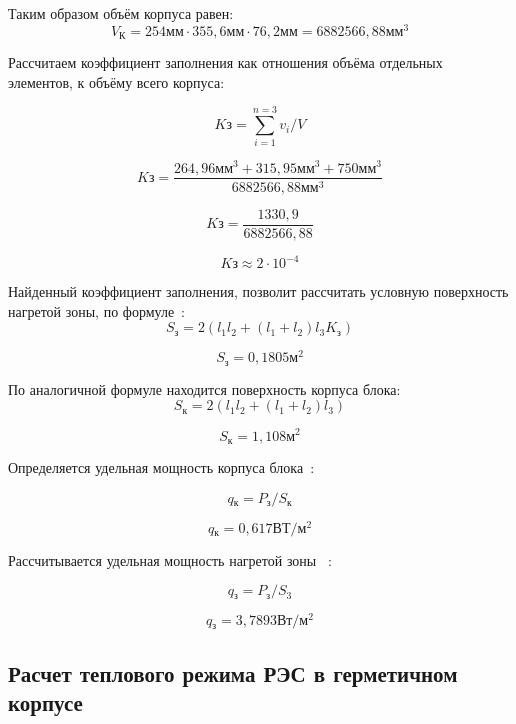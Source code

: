 Таким образом объём корпуса равен:
$$V\mathrm{_К} = 254 \mathrm{мм} \cdot 355,6 \mathrm{мм} \cdot 76,2 \mathrm{мм} = 6882 566,88 \mathrm{мм^3}$$

Рассчитаем коэффициент заполнения как отношения объёма отдельных элементов, к объёму всего корпуса:

$$ K\mathrm{з} = \sum^{n=3}_{i=1} v_{i}/V$$

$$K\mathrm{з} = \frac{264,96 \mathrm{мм}^3 + 315,95 \mathrm{мм}^3 + 750 \mathrm{мм}^3}{6882 566,88 \mathrm{мм^3}} $$

$$K\mathrm{з} = \frac{1 330,9}{6882 566,88}$$

$$K\mathrm{з} \approx 2 \cdot 10^{-4}$$

Найденный коэффициент заполнения, позволит рассчитать условную
поверхность нагретой зоны, по формуле~\cite{Rotkop1976}:
\begin{equation}
  S\mathrm{_з} = 2(l_1 l_2 + (l_1+l_2) l_3 K\mathrm{_з})
\end{equation}

$$S\mathrm{_з} = 0,1805 \mathrm{м^2}$$

По аналогичной формуле находится поверхность корпуса блока:
\begin{equation}
  S\mathrm{_к} = 2(l_1l_2 + (l_1 + l_2)l_3)
\end{equation}

$$S\mathrm{_к} = 1,108\mathrm{м^2}$$

Определяется удельная мощность корпуса блока~\cite{Rotkop1976}:

\begin{equation}
  q\mathrm{_к} = P\mathrm{_з}/S\mathrm{_к}
\end{equation}

$$q\mathrm{_к} = 0,617 \mathrm{ВТ/м^2}$$
\newpage

Рассчитывается удельная мощность нагретой зоны ~\cite{Rotkop1976}:

\begin{equation}
  q\mathrm{_з} = P\mathrm{_з}/S\mathrm{_3}
\end{equation}

$$q\mathrm{_з} = 3,7893 \mathrm{ Вт/м^2}$$

\subsection{Расчет теплового режима РЭС в герметичном корпусе}


